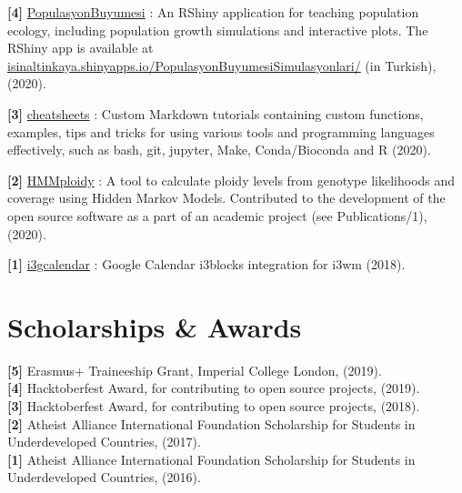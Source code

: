 \documentclass[letterpaper,10.5pt]{article}
\begin{document}
\textbf{[4]} \hspace{0.42cm} \href{https://github.com/isinaltinkaya/PopulasyonBuyumesi}{PopulasyonBuyumesi} : An RShiny application for teaching population ecology, including population growth simulations and interactive plots. The RShiny app is available at \href{https://isinaltinkaya.shinyapps.io/PopulasyonBuyumesiSimulasyonlari/}{isinaltinkaya.shinyapps.io/PopulasyonBuyumesiSimulasyonlari/} (in Turkish), (2020).\\
\smallskip

\textbf{[3]} \hspace{0.42cm} \href{https://github.com/isinaltinkaya/cheatsheets}{cheatsheets} : Custom Markdown tutorials containing custom functions, examples, tips and tricks for using various tools and programming languages effectively, such as bash, git, jupyter, Make, Conda/Bioconda and R (2020). \\
\smallskip

\textbf{[2]} \hspace{0.42cm} \href{https://github.com/SamueleSoraggi/HMMploidy}{HMMploidy} : A tool to calculate ploidy levels from genotype likelihoods and coverage using Hidden Markov Models. Contributed to the development of the open source software as a part of an academic project (see Publications/1), (2020).\\
\smallskip

\textbf{[1]} \hspace{0.42cm} \href{https://github.com/isinaltinkaya/i3gcalendar}{i3gcalendar} : Google Calendar i3blocks integration for i3wm (2018). \\
\smallskip


\section{Scholarships \& Awards}
\textbf{[5]} \hspace{0.42cm} Erasmus+ Traineeship Grant, Imperial College London, (2019). \\
\textbf{[4]} \hspace{0.42cm} Hacktoberfest Award, for contributing to open source projects, (2019). \\
\textbf{[3]} \hspace{0.42cm} Hacktoberfest Award, for contributing to open source projects, (2018). \\
\textbf{[2]} \hspace{0.42cm} Atheist Alliance International Foundation Scholarship for Students in Underdeveloped Countries, (2017). \\
\textbf{[1]} \hspace{0.42cm} Atheist Alliance International Foundation Scholarship for Students in Underdeveloped Countries, (2016). \\
\end{document}
